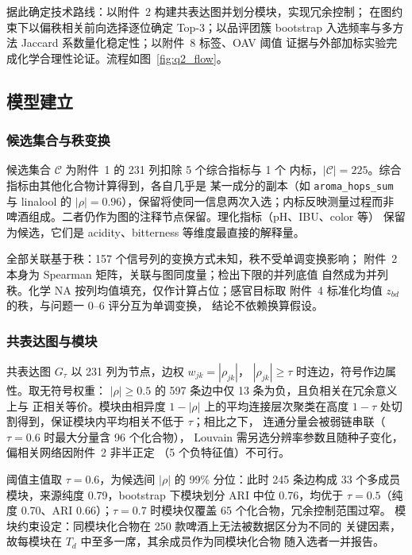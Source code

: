 \documentclass[12pt,a4paper]{article}
\begin{document}
据此确定技术路线：以附件~2 构建共表达图并划分模块，实现冗余控制；
在图约束下以偏秩相关前向选择逐位确定 Top-3；以品评团簇 bootstrap
入选频率与多方法 Jaccard 系数量化稳定性；以附件~8 标签、OAV 阈值
证据与外部加标实验完成化学合理性论证。流程如图~\ref{fig:q2_flow}。


\subsection{模型建立}

\subsubsection{候选集合与秩变换}

候选集合 $\mathcal C$ 为附件~1 的 231 列扣除 5 个综合指标与 1 个
内标，$|\mathcal C|=225$。综合指标由其他化合物计算得到，各自几乎是
某一成分的副本（如 \verb|aroma_hops_sum| 与 linalool 的
$|\rho|=0.96$），保留将使同一信息两次入选；内标反映测量过程而非
啤酒组成。二者仍作为图的注释节点保留。理化指标（pH、IBU、color 等）
保留为候选，它们是 acidity、bitterness 等维度最直接的解释量。

全部关联基于秩：157 个信号列的变换方式未知，秩不受单调变换影响；
附件~2 本身为 Spearman 矩阵，关联与图同度量；检出下限的并列底值
自然成为并列秩。化学 NA 按列均值填充，仅作计算占位；感官目标取
附件~4 标准化均值 $z_{bd}$ 的秩，与问题一 0--6 评分互为单调变换，
结论不依赖换算假设。

\subsubsection{共表达图与模块}

共表达图 $G_\tau$ 以 231 列为节点，边权 $w_{jk}=|\rho_{jk}|$，
$|\rho_{jk}|\ge\tau$ 时连边，符号作边属性。取无符号权重：
$|\rho|\ge0.5$ 的 597 条边中仅 13 条为负，且负相关在冗余意义上与
正相关等价。模块由相异度 $1-|\rho|$ 上的平均连接层次聚类在高度
$1-\tau$ 处切割得到，保证模块内平均相关不低于 $\tau$；相比之下，
连通分量会被弱链串联（$\tau=0.6$ 时最大分量含 96 个化合物），
Louvain 需另选分辨率参数且随种子变化，偏相关网络因附件~2 非半正定
（5 个负特征值）不可行。

阈值主值取 $\tau=0.6$，为候选间 $|\rho|$ 的 99\% 分位：此时 245
条边构成 33 个多成员模块，来源纯度 0.79，bootstrap 下模块划分 ARI
中位 0.76，均优于 $\tau=0.5$（纯度 0.70、ARI 0.66）；$\tau=0.7$
时模块仅覆盖 65 个化合物，冗余控制范围过窄。
模块约束设定：同模块化合物在 250 款啤酒上无法被数据区分为不同的
关键因素，故每模块在 $T_d$ 中至多一席，其余成员作为同模块化合物
随入选者一并报告。
\end{document}
